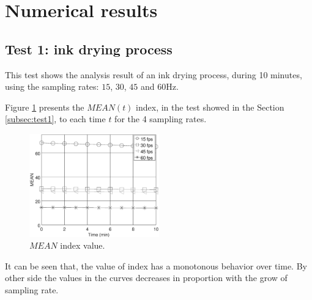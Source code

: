 \documentclass[review]{elsarticle}
\begin{document}
\section{Numerical results} 
\label{sec:numericalresults}

\subsection{Test 1: ink drying process}
\label{subsec:resulttest1}
This test shows the analysis result of an ink drying process, during 10 minutes,
using the sampling rates: $15$, $30$, $45$ and $60$Hz.

Figure \ref{fig:MEANtest1} presents the $MEAN(t)$ index,
in the test showed in the Section \ref{subsec:test1},
to each time $t$ for the  4 sampling rates.
\begin{figure}[ht!]
    \centering
    \includegraphics[width=0.5\textwidth]{FPS_f11_rawMEAN.eps}
    \caption{$MEAN$ index value.}\label{fig:MEANtest1}
\end{figure}
It can be seen that, 
the value of index has a monotonous behavior over time. 
By other side the values in the curves decreases in proportion with 
the grow of sampling rate.
\end{document}
